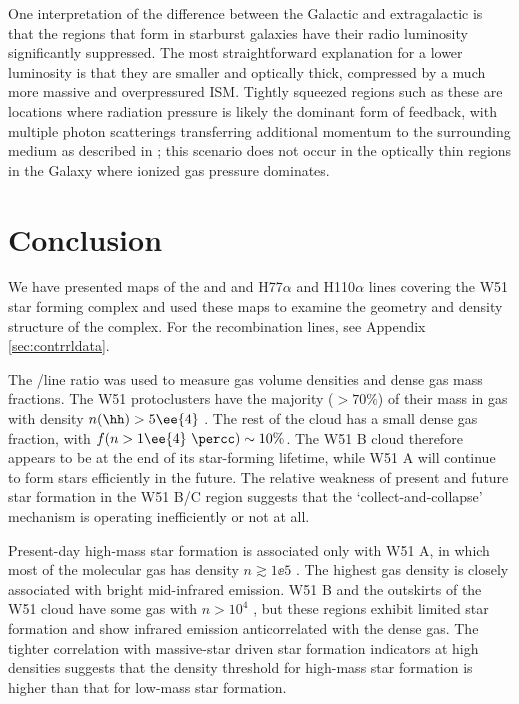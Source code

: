 One interpretation of the difference between the Galactic and
extragalactic \formaldehyde is that the \hii regions that form in starburst
galaxies have their radio luminosity significantly suppressed.  The most
straightforward explanation for a lower luminosity is that they are smaller and
optically thick, compressed by a much more massive and overpressured
ISM.  Tightly squeezed \hii regions such as these are locations where radiation
pressure is likely the dominant form of feedback, with multiple photon
scatterings transferring additional momentum to the surrounding medium as
described in \citet{Murray2010b}; this scenario does not occur in the optically
thin \hii regions in the Galaxy where ionized gas pressure dominates.


\section{Conclusion}
\label{sec:conclusion}
We have presented maps of the \formaldehyde \oneone and \twotwo and H77$\alpha$
and H110$\alpha$ lines covering the W51 star forming complex and used these maps
to examine the geometry and density structure of the complex.  For the
recombination lines, see Appendix \ref{sec:contrrldata}.

The \formaldehyde \oneone/\twotwo line ratio was used to measure gas volume
densities and dense gas mass fractions.  The W51 protoclusters have the majority
($>70\%$) of their mass in gas with density $n(\hh)>5\ee{4}$ \percc.  The rest of
the cloud has a small dense gas fraction, with $f(n>1\ee{4}~\percc) \sim 10\%$.
The W51 B cloud therefore appears to be at the end of its star-forming
lifetime, while W51 A will continue to form stars efficiently in the
future.  The relative weakness of present and future star formation
in the W51 B/C region suggests that the `collect-and-collapse' mechanism
is operating inefficiently or not at all.

Present-day high-mass star formation is associated only with W51 A, in
which most of the molecular gas has density $n\gtrsim1\ee{5}$ \percc.  The
highest gas density is closely associated with bright mid-infrared emission.
W51 B and the outskirts of the W51 cloud have some gas with $n>10^4$ \percc,
but these regions exhibit limited star formation and show infrared emission
anticorrelated with the dense gas.  The tighter correlation with massive-star
driven star formation indicators at high densities suggests that the density
threshold for high-mass star formation is higher than that for low-mass star
formation.


